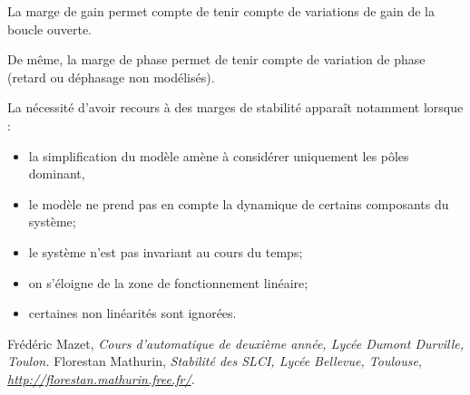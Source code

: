 \documentclass[10pt,fleqn]{article} %
\begin{document}
 
La marge de gain permet compte de tenir compte de variations de gain de la boucle ouverte. 

De même, la marge de phase permet de tenir compte de variation de phase (retard ou déphasage non modélisés). 

La nécessité d'avoir recours à des marges de stabilité apparaît notamment lorsque : 
\begin{itemize}
\item la simplification du modèle amène à considérer uniquement les pôles dominant, 
\item le modèle ne prend pas en compte la dynamique de certains composants du système;
\item le système n'est pas invariant au cours du temps;
\item on s'éloigne de la zone de fonctionnement linéaire;
\item certaines non linéarités sont ignorées.
\end{itemize}

\begin{thebibliography}{2}
    Frédéric Mazet, {\it Cours d'automatique de deuxième année, Lycée Dumont Durville, Toulon.}
       Florestan Mathurin, {\it Stabilité des SLCI, Lycée Bellevue, Toulouse, \url{http://florestan.mathurin.free.fr/}.}



\end{thebibliography}
\end{document}
